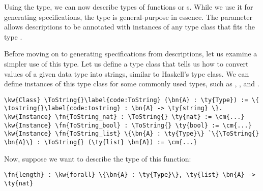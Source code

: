 Using the \reified{} type, we can now describe types of functions or \constructor{}s. While we use it for generating specifications, the \reified{} type is general-purpose in essence. The \gls{parameter}  allows descriptions to be annotated with instances of any type class that fits the type .

Before moving on to generating specifications from \reified{} descriptions, let us examine a simpler use of this type.
Let us define a type class that tells us how to convert values of a given data type into strings, similar to Haskell's  type class. We can define instances of this type class for some commonly used types, such as , , and .

  
  



\newcommand{\ToString}{\hyperref[code:ToString]{\ty{ToString}}}
\newcommand{\tostring}{\hyperref[code:tostring]{\fn{to\_\linebreak[0]string}}}

\begin{Verbatim}
\kw{Class} \ToString{}\label{code:ToString} (\bn{A} : \ty{Type}) := \{ \tostring{}\label{code:tostring} : \bn{A} -> \ty{string} \}.
\kw{Instance} \fn{ToString_nat} : \ToString{} \ty{nat} := \cm{...}
\kw{Instance} \fn{ToString_bool} : \ToString{} \ty{bool} := \cm{...}
\kw{Instance} \fn{ToString_list} \{\bn{A} : \ty{Type}\} `\{\ToString{} \bn{A}\} : \ToString{} (\ty{list} \bn{A}) := \cm{...}
\end{Verbatim}

Now, suppose we want to describe the type of this function:

\begin{Verbatim}
\fn{length} : \kw{forall} \{\bn{A} : \ty{Type}\}, \ty{list} \bn{A} -> \ty{nat}
\end{Verbatim}

